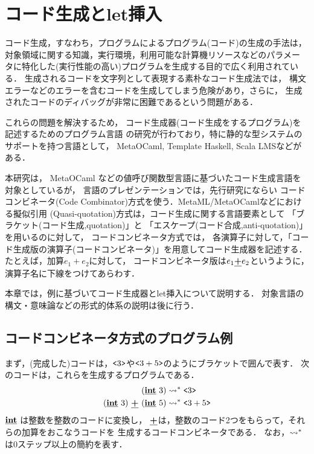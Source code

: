 
\section{コード生成とlet挿入}

コード生成，すなわち，プログラムによるプログラム(コード)の生成の手法は，
対象領域に関する知識，実行環境，利用可能な計算機リソースなどのパラメー
タに特化した(実行性能の高い)プログラムを生成する目的で広く利用されている．
生成されるコードを文字列として表現する素朴なコード生成法では，
構文エラーなどのエラーを含むコードを生成してしまう危険があり，さらに，
生成されたコードのディバッグが非常に困難であるという問題がある．

これらの問題を解決するため，
コード生成器(コード生成をするプログラム)を記述するためのプログラム言語
の研究が行わており，特に静的な型システムのサポートを持つ言語として，
MetaOCaml, Template Haskell, Scala LMSなどがある．

本研究は，
MetaOCaml などの値呼び関数型言語に基づいたコード生成言語を対象としているが，
言語のプレゼンテーションでは，先行研究にならい
コードコンビネータ(Code Combinator)方式を使う．MetaML/MetaOCamlなどにおける擬似引用
(Quasi-quotation)方式は，コード生成に関する言語要素として
「ブラケット(コード生成,quotation)」と
「エスケープ(コード合成,anti-quotation)」を用いるのに対して，
コードコンビネータ方式では，
各演算子に対して，「コード生成版の演算子(コードコンビネータ)」を用意してコード生成器を記述する．
たとえば，加算$e_1+e_2$に対して，
コードコンビネータ版は$e_1 \underline{\textbf{+}} e_2$というように，
演算子名に下線をつけてあらわす．

本章では，例に基づいてコード生成器とlet挿入について説明する．
対象言語の構文・意味論などの形式的体系の説明は後に行う．

\subsection{コードコンビネータ方式のプログラム例}

まず，(完成した)コードは，$\texttt{<}{3}\texttt{>}$や$\texttt{<}{3+5}\texttt{>}$のようにブラケットで囲んで表す．
次のコードは，これらを生成するプログラムである．
\begin{align*}
(\underline{\textbf{int}}~3)   & \leadsto^* \texttt{<}{3}\texttt{>} \\
(\underline{\textbf{int}}~3)~ \underline{\textbf{+}}~ (\underline{\textbf{int}}~5) & \leadsto^* \texttt{<}{3 + 5}\texttt{>}
\end{align*}
$\underline{\textbf{int}}$ は整数を整数のコードに変換し，
$\underline{\textbf{+}}$は，整数のコード2つをもらって，それらの加算をおこなうコードを
生成するコードコンビネータである．
なお，$\leadsto^*$は0ステップ以上の簡約を表す．


